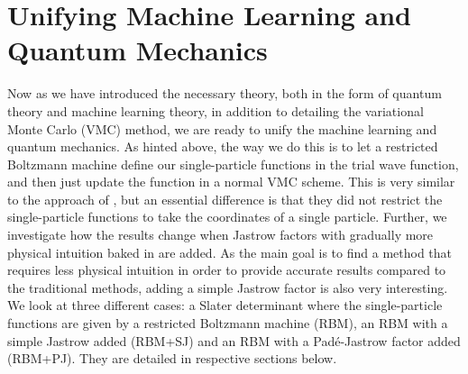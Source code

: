 \chapter{Unifying Machine Learning and Quantum Mechanics} \label{chp:VMCwRBM}

Now as we have introduced the necessary theory, both in the form of quantum theory and machine learning theory, in addition to detailing the variational Monte Carlo (VMC) method, we are ready to unify the machine learning and quantum mechanics. As hinted above, the way we do this is to let a restricted Boltzmann machine define our single-particle functions in the trial wave function, and then just update the function in a normal VMC scheme. This is very similar to the approach of \citet{pfau2019abinitio}, but an essential difference is that they did not restrict the single-particle functions to take the coordinates of a single particle. Further, we investigate how the results change when Jastrow factors with gradually more physical intuition baked in are added. As the main goal is to find a method that requires less physical intuition in order to provide accurate results compared to the traditional methods, adding a simple Jastrow factor is also very interesting. We look at three different cases: a Slater determinant where the single-particle functions are given by a restricted Boltzmann machine (RBM), an RBM with a simple Jastrow added (RBM+SJ) and an RBM with a Padé-Jastrow factor added (RBM+PJ). They are detailed in respective sections below.

